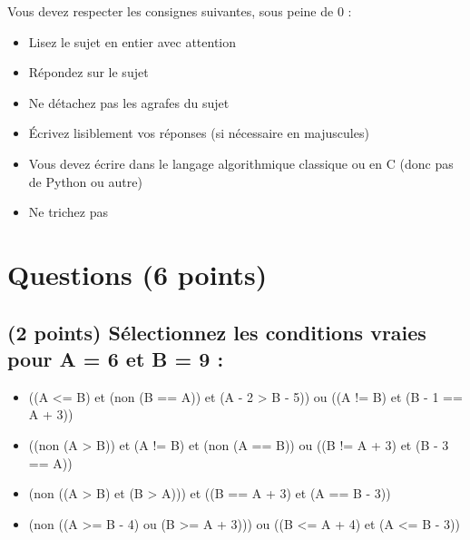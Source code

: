 \documentclass[11pt,a4paper]{article}
\begin{document}
\MakeExamTitle                   %


\bigskip

Vous devez respecter les consignes suivantes, sous peine de 0 :

\begin{itemize}
\item Lisez le sujet en entier avec attention
\item Répondez sur le sujet
\item Ne détachez pas les agrafes du sujet
\item \'Ecrivez lisiblement vos réponses (si nécessaire en majuscules)
\item Vous devez écrire dans le langage algorithmique classique ou en C (donc pas de Python ou autre)
\item Ne trichez pas
\end{itemize}



\section{Questions (6 points)}

\subsection{(2 points) Sélectionnez les conditions vraies pour A = 6 et B = 9 : }

\bigskip

\begin{itemize}
  \item[\CaseCoche] ((A <= B) et (non (B == A)) et (A - 2 > B - 5)) ou ((A != B) et (B - 1 == A + 3)) \\ %
  \item[\CaseCoche] ((non (A > B)) et (A != B) et (non (A == B)) ou ((B != A + 3) et (B - 3 == A)) \\ %
  \item[\CaseCoche] (non ((A > B) et (B > A))) et ((B == A + 3) et (A == B - 3)) \\ %
  \item[\CaseCoche] (non ((A >= B - 4) ou (B >= A + 3))) ou ((B <= A + 4) et (A <= B - 3)) \\ %
\end{itemize}
\end{document}
